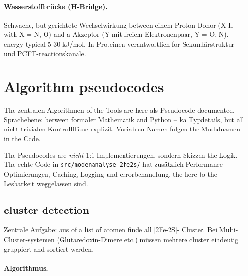 \documentclass[11pt,a4paper,twoside]{article}
\theoremstyle{remark}
\begin{document}
\paragraph{Wasserstoffbr\"ucke (H-Bridge).}
Schwache, but gerichtete Wechselwirkung between einem
Proton-Donor (X-H with X = N, O) and a Akzeptor (Y mit
freiem Elektronenpaar, Y = O, N). energy typical 5-30
kJ/mol. In Proteinen verantwortlich for Sekund\"arstruktur und
PCET-reactionskan\"ale.

\section{Algorithm pseudocodes}
\label{app:pseudocodes}

The zentralen Algorithmen of the Tools are here als Pseudocode
documented. Sprachebene: between formaler Mathematik and Python --
ka Typdetails, but all nicht-trivialen Kontrollfl\"usse
explizit. Variablen-Namen folgen the Modulnamen in the Code.

The Pseudocodes are \emph{nicht} 1:1-Implementierungen, sondern
Skizzen the Logik. The echte Code in \texttt{src/modenanalyse\_2fe2s/}
hat zus\"atzlich Performance-Optimierungen, Caching, Logging und
errorbehandlung, the here to the Lesbarkeit weggelassen sind.

\subsection{cluster detection}
\label{app:pseudo-cluster}

Zentrale Aufgabe: aus of a list of atomen finde all [2Fe-2S]-
Cluster. Bei Multi-Cluster-systemen (Glutaredoxin-Dimere etc.) m\"ussen
mehrere cluster eindeutig gruppiert and sortiert werden.

\paragraph{Algorithmus.}
\end{document}
